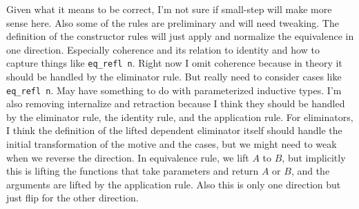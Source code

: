 Given what it means to be correct, I'm not sure if small-step will make more sense here.
Also some of the rules are preliminary and will need tweaking.
The definition of the constructor rules will just apply and normalize the equivalence in one direction.
Especially coherence and its relation to identity and how to capture things like \lstinline{eq_refl n}.
Right now I omit coherence because in theory it should be handled by the eliminator rule.
But really need to consider cases like \lstinline{eq_refl n}.
May have something to do with parameterized inductive types.
I'm also removing internalize and retraction because I think they should be handled
by the eliminator rule, the identity rule, and the application rule.
For eliminators, I think the definition of the lifted dependent eliminator itself should handle the initial transformation
of the motive and the cases, but we might need to weak when we reverse the direction.
In equivalence rule, we lift $A$ to $B$, but implicitly this is lifting the functions that take parameters and return $A$ or $B$,
and the arguments are lifted by the application rule.
Also this is only one direction but just flip for the other direction.

